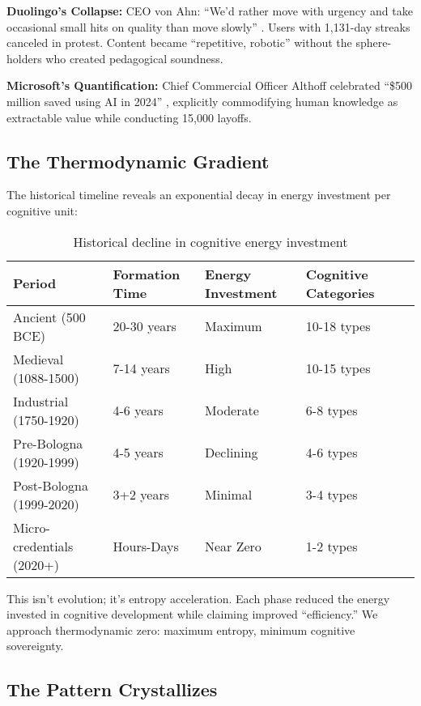 \textbf{Duolingo's Collapse:} CEO von Ahn: ``We'd rather move with urgency and take occasional small hits on quality than move slowly'' \citep{vonahn2024}. Users with 1,131-day streaks canceled in protest. Content became ``repetitive, robotic'' without the sphere-holders who created pedagogical soundness.

\textbf{Microsoft's Quantification:} Chief Commercial Officer Althoff celebrated ``\$500 million saved using AI in 2024'' \citep{althoff2024}, explicitly commodifying human knowledge as extractable value while conducting 15,000 layoffs.

\subsection{The Thermodynamic Gradient}

The historical timeline reveals an exponential decay in energy investment per cognitive unit:

\begin{table}[h]
\centering
\begin{tabular}{lllll}
\hline
\textbf{Period} & \textbf{Formation Time} & \textbf{Energy Investment} & \textbf{Cognitive Categories} \\
\hline
Ancient (500 BCE) & 20-30 years & Maximum & 10-18 types \\
Medieval (1088-1500) & 7-14 years & High & 10-15 types \\
Industrial (1750-1920) & 4-6 years & Moderate & 6-8 types \\
Pre-Bologna (1920-1999) & 4-5 years & Declining & 4-6 types \\
Post-Bologna (1999-2020) & 3+2 years & Minimal & 3-4 types \\
Micro-credentials (2020+) & Hours-Days & Near Zero & 1-2 types \\
\hline
\end{tabular}
\caption{Historical decline in cognitive energy investment}
\end{table}

This isn't evolution; it's entropy acceleration. Each phase reduced the energy invested in cognitive development while claiming improved ``efficiency.'' We approach thermodynamic zero: maximum entropy, minimum cognitive sovereignty.

\subsection{The Pattern Crystallizes}


